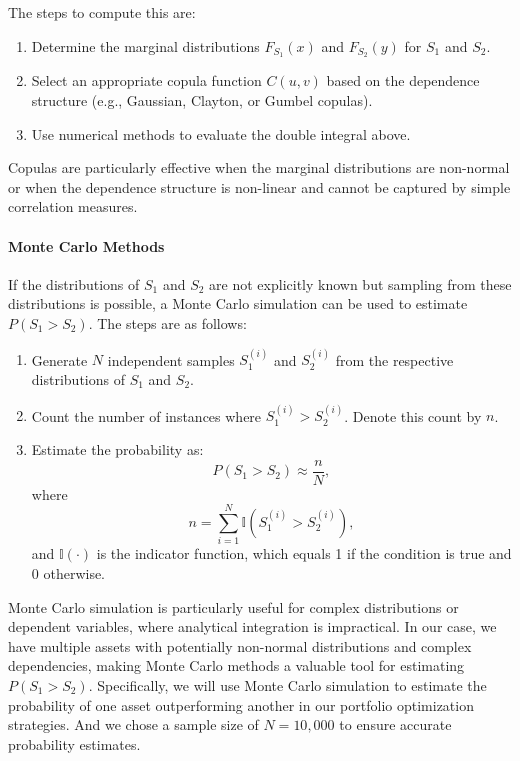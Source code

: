 The steps to compute this are:
\begin{enumerate}
    \item Determine the marginal distributions $F_{S_1}(x)$ and $F_{S_2}(y)$ for $S_1$ and $S_2$.
    \item Select an appropriate copula function $C(u, v)$ based on the dependence structure (e.g., Gaussian, Clayton, or Gumbel copulas).
    \item Use numerical methods to evaluate the double integral above.
\end{enumerate}

Copulas are particularly effective when the marginal distributions are non-normal or when the dependence structure is non-linear and cannot be captured by simple correlation measures.

\paragraph{Monte Carlo Methods}

If the distributions of $S_1$ and $S_2$ are not explicitly known but sampling from these distributions is possible, a Monte Carlo simulation can be used to estimate $P(S_1 > S_2)$. The steps are as follows:
\begin{enumerate}
    \item Generate $N$ independent samples $S_1^{(i)}$ and $S_2^{(i)}$ from the respective distributions of $S_1$ and $S_2$.
    \item Count the number of instances where $S_1^{(i)} > S_2^{(i)}$. Denote this count by $n$.
    \item Estimate the probability as:
    \begin{equation}
    P(S_1 > S_2) \approx \frac{n}{N},
    \end{equation}
    where
    \begin{equation}
    n = \sum_{i=1}^N \mathbb{I}(S_1^{(i)} > S_2^{(i)}),
    \end{equation}
    and $\mathbb{I}(\cdot)$ is the indicator function, which equals 1 if the condition is true and 0 otherwise.
\end{enumerate}

Monte Carlo simulation is particularly useful for complex distributions or dependent variables, where analytical integration is impractical. In our case, we have multiple assets with potentially non-normal distributions and complex dependencies, making Monte Carlo methods a valuable tool for estimating $P(S_1 > S_2)$.
Specifically, we will use Monte Carlo simulation to estimate the probability of one asset outperforming another in our portfolio optimization strategies. And we chose a sample size of $N = 10,000$ to ensure accurate probability estimates.

